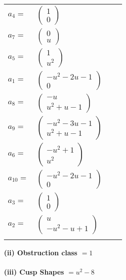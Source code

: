 \documentclass[1p]{elsarticle_modified}
\theoremstyle{definition}
\begin{document}
\begin{tabular}{m{7pt} m{180pt} m{7pt} m{180pt} }
\flushright $a_{4}=$&$\begin{pmatrix}1\\0\end{pmatrix}$ \\
\flushright $a_{7}=$&$\begin{pmatrix}0\\u\end{pmatrix}$ \\
\flushright $a_{5}=$&$\begin{pmatrix}1\\u^2\end{pmatrix}$ \\
\flushright $a_{1}=$&$\begin{pmatrix}- u^2-2 u-1\\0\end{pmatrix}$ \\
\flushright $a_{8}=$&$\begin{pmatrix}- u\\u^2+u-1\end{pmatrix}$ \\
\flushright $a_{9}=$&$\begin{pmatrix}- u^2-3 u-1\\u^2+u-1\end{pmatrix}$ \\
\flushright $a_{6}=$&$\begin{pmatrix}- u^2+1\\u^2\end{pmatrix}$ \\
\flushright $a_{10}=$&$\begin{pmatrix}- u^2-2 u-1\\0\end{pmatrix}$ \\
\flushright $a_{3}=$&$\begin{pmatrix}1\\0\end{pmatrix}$ \\
\flushright $a_{2}=$&$\begin{pmatrix}u\\- u^2- u+1\end{pmatrix}$\\&\end{tabular}
\flushleft \textbf{(ii) Obstruction class $= 1$}\\~\\
\flushleft \textbf{(iii) Cusp Shapes $= u^2-8$}\\~\\
\end{document}
